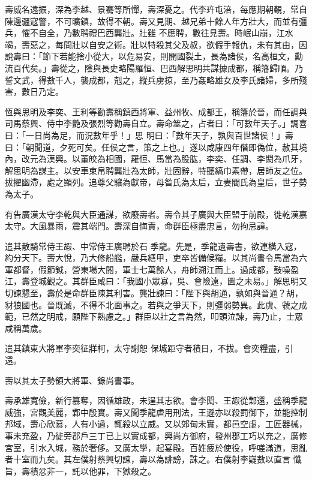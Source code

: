 \begin{pinyinscope}
 壽威名遠振，深為李越、景騫等所憚，壽深憂之。代李玝屯涪，每應期朝覲，常自陳邊疆寇警，不可曠鎮，故得不朝。壽又見期、越兄弟十餘人年方壯大，而並有彊兵，懼不自全，乃數聘禮巴西龔壯。壯雖
 不應聘，數往見壽。時岷山崩，江水竭，壽惡之，每問壯以自安之術。壯以特殺其父及叔，欲假手報仇，未有其由，因說壽曰：「節下若能捨小從大，以危易安，則開國裂土，長為諸侯，名高桓文，勳流百代矣。」壽從之，陰與長史略陽羅恒、巴西解思明共謀據成都，稱籓歸順。乃誓文武，得數千人，襲成都，剋之，縱兵虜掠，至乃姦略雄女及李氏諸婦，多所殘害，數日乃定。



 恆與思明及李奕、王利等勸壽稱鎮西將軍、益州牧、成都王，稱籓於晉，而任調與司馬蔡興、侍中李艷及張烈等勸壽自立。壽命筮之，占者曰：「可數年天子。」調喜曰：「一日尚為足，而況數年乎！」思
 明曰：「數年天子，孰與百世諸侯！」壽曰：「朝聞道，夕死可矣。任侯之言，策之上也。」遂以咸康四年僭即偽位，赦其境內，改元為漢興。以董皎為相國，羅恒、馬當為股肱，李奕、任調、李閎為爪牙，解思明為謀主。以安車束帛聘龔壯為太師，壯固辭，特聽縞巾素帶，居師友之位。拔擢幽滯，處之顯列。追尊父驤為獻帝，母昝氏為太后，立妻閻氏為皇后，世子勢為太子。



 有告廣漢太守李乾與大臣通謀，欲廢壽者。壽令其子廣與大臣盟于前殿，徙乾漢嘉太守。大風暴雨，震其端門。壽深自悔責，命群臣極盡忠言，勿拘忌諱。



 遣其散騎常侍王嘏、中常侍王廣聘於石
 季龍。先是，季龍遺壽書，欲連橫入寇，約分天下。壽大悅，乃大修船艦，嚴兵繕甲，吏卒皆備候糧。以其尚書令馬當為六軍都督，假節鉞，營東場大閱，軍士七萬餘人，舟師溯江而上。過成都，鼓噪盈江，壽登城觀之。其群臣咸曰：「我國小眾寡，吳、會險遠，圖之未易。」解思明又切諫懇至，壽於是命群臣陳其利害。龔壯諫曰：「陛下與胡通，孰如與晉通？胡，豺狼國也。晉既滅，不得不北面事之。若與之爭天下，則彊弱勢異。此虞、虢之成範，已然之明戒，願陛下熟慮之。」群臣以壯之言為然，叩頭泣諫，壽乃止，士眾咸稱萬歲。



 遣其鎮東大將軍李奕征牂柯，太守謝恕
 保城距守者積日，不拔。會奕糧盡，引還。



 壽以其太子勢領大將軍、錄尚書事。



 壽承雄寬儉，新行篡奪，因循雄政，未逞其志欲。會李閎、王嘏從鄴還，盛稱季龍威強，宮觀美麗，鄴中殷實。壽又聞季龍虐用刑法，王遜亦以殺罰御下，並能控制邦域，壽心欣慕，人有小過，輒殺以立威。又以郊甸未實，都邑空虛，工匠器械，事未充盈，乃徙旁郡戶三丁已上以實成都，興尚方御府，發州郡工巧以充之，廣修宮室，引水入城，務於奢侈。又廣太學，起宴殿。百姓疲於使役，呼嗟滿道，思亂者十室而九矣。其左僕射蔡興切諫，壽以為誹謗，誅之。右僕射李嶷數以直言
 懺旨，壽積忿非一，託以他罪，下獄殺之。




\end{pinyinscope}
